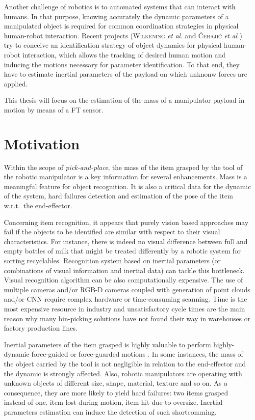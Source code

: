 \documentclass[/home/francois/latex/report/main.tex]{subfiles}
\begin{document}
Another challenge of robotics is to automated systems that can interact with humans. In that purpose, knowing accurately the dynamic parameters of a manipulated object is required for common coordination strategies in physical human-robot interaction. Recent projects (\textsc{Wilkening} \textit{et al.} \cite{Wilkening2016} and \textsc{Ćehajić} \textit{et al} \cite{Ćehajić2017}) try to conceive an identification strategy of object dynamics for physical human-robot interaction, which allows the tracking of desired human motion and inducing the motions necessary for parameter identification. To that end, they have to estimate inertial parameters of the payload on which unknonw forces are applied.

This thesis will focus on the estimation of the mass of a manipulator payload in motion by means of a \ac{FT} sensor.

\section{Motivation}

Within the scope of \textit{pick-and-place}, the mass of the item grasped by the tool of the robotic manipulator is a key information for several enhancements. Mass is a meaningful feature for object recognition. It is also a critical data for the dynamic of the system, hard failures detection and estimation of the pose of the item w.r.t.\ the end-effector.

Concerning item recognition, it appears that purely vision based approaches may fail if the objects to be identified are similar with respect to their visual characteristics. For instance, there is indeed no visual difference between full and empty bottles of milk that might be treated differently by a robotic system for sorting recyclables. Recognition system based on inertial parameters (or combinations of visual information and inertial data) can tackle this bottleneck.
Visual recognition algorithm can be also computationally expensive. The use of multiple cameras and/or RGB-D cameras coupled with generation of point clouds and/or \ac{CNN} require complex hardware or time-consuming scanning. Time is the most expensive resource in industry and unsatisfactory cycle times are the main reason why many bin-picking solutions have not found their way in warehouses or factory production lines.

Inertial parameters of the item grasped is highly valuable to perform highly-dynamic force-guided or force-guarded motions \cite{Garcia2006, KubusKroger2008}. In some instances, the mass of the object carried by the tool is not negligible in relation to the end-effector and the dynamic is strongly affected.
Also, robotic manipulators are operating with unknown objects of different size, shape, material, texture and so on. As a consequence, they are more likely to yield hard failures: two items grasped instead of one, item lost during motion, item hit due to oversize. Inertial parameters estimation can induce the detection of such shortcomming.
\end{document}
